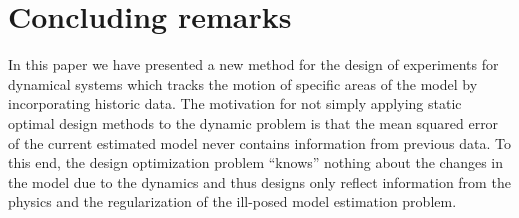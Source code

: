 \documentclass[leqno,onefignum,onetabnum]{siamltexmm}
\newcommand{\bfm}	{{\bf{m}}}
\begin{document}


\section{Concluding remarks}
In this paper we have presented a new method for the design of experiments for dynamical systems which tracks the motion of specific areas of the model by incorporating historic data. 
The motivation for not simply applying static optimal design methods to the dynamic problem is that the mean squared error of the current estimated model never contains information from previous data.
To this end, the design optimization problem ``knows'' nothing about the changes in  the model due to the dynamics and thus designs only reflect information from the physics and the regularization of the ill-posed model estimation problem.  
\end{document}
